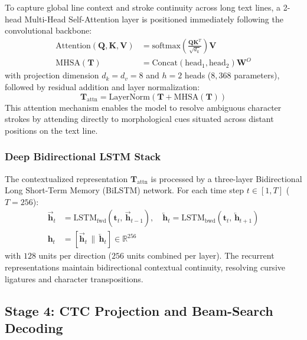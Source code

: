 \documentclass{IEEEtran}
\begin{document}
To capture global line context and stroke continuity across long text lines, a 2-head Multi-Head Self-Attention layer is positioned immediately following the convolutional backbone:
\begin{align}
\text{Attention}(\mathbf{Q}, \mathbf{K}, \mathbf{V}) &= \text{softmax}\left(\frac{\mathbf{Q}\mathbf{K}^T}{\sqrt{d_k}}\right)\mathbf{V} \label{eq:attention} \\
\text{MHSA}(\mathbf{T}) &= \text{Concat}(\text{head}_1, \text{head}_2)\mathbf{W}^O \label{eq:mhsa}
\end{align}
with projection dimension $d_k = d_v = 8$ and $h = 2$ heads ($8,368$ parameters), followed by residual addition and layer normalization:
\begin{equation}
\mathbf{T}_{\text{attn}} = \text{LayerNorm}\left(\mathbf{T} + \text{MHSA}(\mathbf{T})\right)
\end{equation}
\noindent This attention mechanism enables the model to resolve ambiguous character strokes by attending directly to morphological cues situated across distant positions on the text line.

\subsubsection{Deep Bidirectional LSTM Stack}

The contextualized representation $\mathbf{T}_{\text{attn}}$ is processed by a three-layer Bidirectional Long Short-Term Memory (BiLSTM) network. For each time step $t \in [1, T]$ ($T = 256$):
\begin{align}
\overrightarrow{\mathbf{h}}_t &= \text{LSTM}_{\text{fwd}}\left(\mathbf{t}_t, \, \overrightarrow{\mathbf{h}}_{t-1}\right), \quad \overleftarrow{\mathbf{h}}_t = \text{LSTM}_{\text{bwd}}\left(\mathbf{t}_t, \, \overleftarrow{\mathbf{h}}_{t+1}\right) \label{eq:bilstm_dirs} \\
\mathbf{h}_t &= \left[ \overrightarrow{\mathbf{h}}_t \,\|\, \overleftarrow{\mathbf{h}}_t \right] \in \mathbb{R}^{256} \label{eq:bilstm_concat}
\end{align}
with $128$ units per direction ($256$ units combined per layer). The recurrent representations maintain bidirectional contextual continuity, resolving cursive ligatures and character transpositions.

\subsection{Stage 4: CTC Projection and Beam-Search Decoding}
\end{document}
